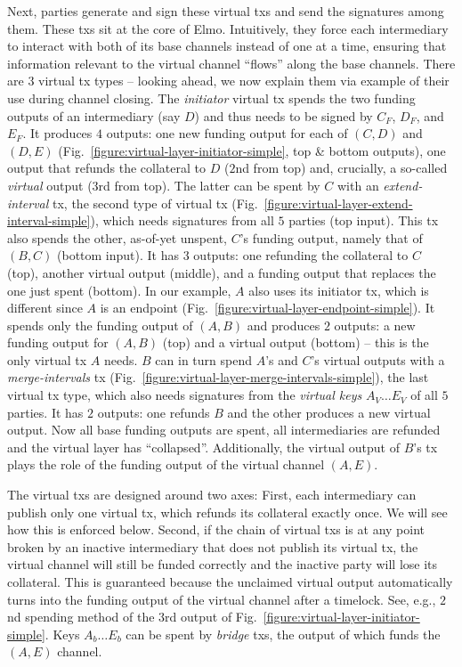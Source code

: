   Next, parties generate and sign these virtual txs and send the signatures among
  them. These txs sit at
  the core of
  Elmo. Intuitively, they force each intermediary to interact with both of its
  base channels instead of one at a time, ensuring that information relevant to
  the virtual channel ``flows'' along the base channels. There are $3$ virtual
  tx types -- looking ahead, we now explain them via example of their use during
  channel closing. The \emph{initiator} virtual tx spends the two funding outputs of an
  intermediary (say $D$) and thus needs to be signed by $C_F$, $D_F$, and $E_F$.
  It produces $4$ outputs: one new funding
  output for each of $(C, D)$ and $(D, E)$
  (Fig.~\ref{figure:virtual-layer-initiator-simple}, top \& bottom outputs), one
  output that refunds the collateral to $D$ ($2$nd from top) and,
  crucially, a so-called \emph{virtual} output ($3$rd from top). The latter
  can be spent by $C$ with an \emph{extend-interval} tx, the second type of virtual
  tx (Fig.~\ref{figure:virtual-layer-extend-interval-simple}), which needs
  signatures from all $5$ parties (top input). This tx also
  spends the other, as-of-yet unspent, $C$'s funding output, namely that of
  $(B,C)$ (bottom
  input). It has $3$ outputs: one refunding the collateral to $C$
  (top), another virtual output (middle), and a funding output that replaces the
  one just spent (bottom). In our example, $A$ also uses its initiator tx, which
  is different since $A$ is an endpoint (Fig.~\ref{figure:virtual-layer-endpoint-simple}). It spends only the funding output of
  $(A, B)$ and produces $2$ outputs: a new funding output for $(A, B)$ (top) and
  a virtual output (bottom) -- this is the only virtual tx $A$ needs. $B$ can in
  turn spend $A$'s and $C$'s virtual outputs with a
  \emph{merge-intervals} tx
  (Fig.~\ref{figure:virtual-layer-merge-intervals-simple}), the last virtual tx
  type, which also needs signatures from the \emph{virtual keys} $A_V \dots E_V$
  of all $5$ parties. It has $2$ outputs: one refunds $B$ and
  the other produces a new virtual
  output. Now
  all base funding outputs are spent, all intermediaries are refunded and the
  virtual layer has ``collapsed''. Additionally, the
  virtual output of $B$'s tx plays the role of the funding output of the virtual
  channel $(A, E)$.

  The virtual txs are designed around two axes: First, each intermediary can
  publish only one virtual tx, which refunds its collateral
  exactly once. We will see how this is enforced below. Second, if the chain of
  virtual txs is at any point broken by
  an inactive intermediary that does not publish its virtual tx, the
  virtual channel will still be funded correctly and the inactive party will
  lose its collateral. This is guaranteed because
  the unclaimed virtual output automatically turns into the funding output of
  the virtual channel
  after a timelock. See, e.g., $2$nd spending method of the $3$rd output of
  Fig.~\ref{figure:virtual-layer-initiator-simple}. Keys $A_b \dots E_b$ can be
  spent by \emph{bridge} txs, the output of which funds the $(A, E)$ channel.

